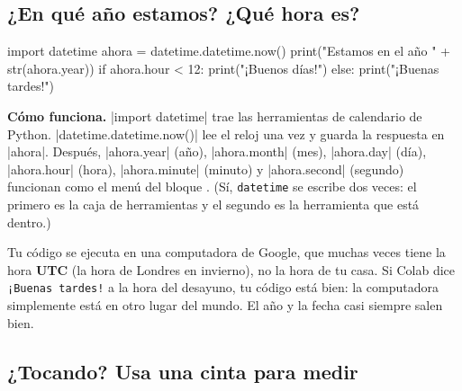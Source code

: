\subsection*{¿En qué año estamos? ¿Qué hora es?}

\begin{center}
\begin{scratch}
\end{scratch}
\end{center}
\vspace{-4pt}
\begin{code}
import datetime
ahora = datetime.datetime.now()
print("Estamos en el año " + str(ahora.year))
if ahora.hour < 12:
    print("¡Buenos días!")
else:
    print("¡Buenas tardes!")
\end{code}

\textbf{Cómo funciona.} \py|import datetime| trae las herramientas de calendario de Python. \py|datetime.datetime.now()| lee el reloj una vez y guarda la respuesta en \py|ahora|. Después, \py|ahora.year| (año), \py|ahora.month| (mes), \py|ahora.day| (día), \py|ahora.hour| (hora), \py|ahora.minute| (minuto) y \py|ahora.second| (segundo) funcionan como el menú del bloque . (Sí, \texttt{datetime} se escribe dos veces: el primero es la caja de herramientas y el segundo es la herramienta que está dentro.)

\begin{watchout}
Tu código se ejecuta en una computadora de Google, que muchas veces tiene la hora \textbf{UTC} (la hora de Londres en invierno), no la hora de tu casa. Si Colab dice \texttt{¡Buenas tardes!} a la hora del desayuno, tu código está bien: la computadora simplemente está en otro lugar del mundo. El año y la fecha casi siempre salen bien.
\end{watchout}

\subsection*{¿Tocando? Usa una cinta para medir}


